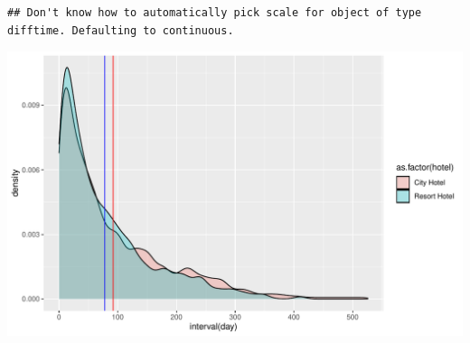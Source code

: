 \documentclass[11pt,a4paper,]{article}
\begin{document}
\begin{verbatim}
## Don't know how to automatically pick scale for object of type difftime. Defaulting to continuous.
\end{verbatim}

\includegraphics{tidy_files/figure-latex/intervaldensity-1.pdf}

\printbibliography
\end{document}
